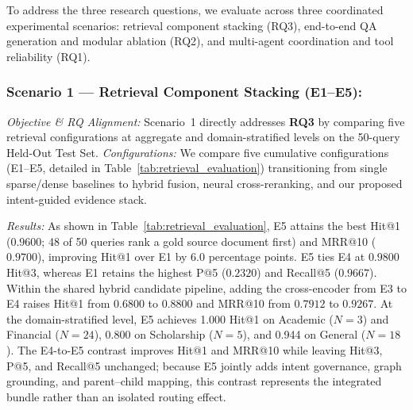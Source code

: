 To address the three research questions, we evaluate \system{} across three coordinated experimental scenarios: retrieval component stacking (RQ3), end-to-end QA generation and modular ablation (RQ2), and multi-agent coordination and tool reliability (RQ1).

\subsubsection{Scenario 1 --- Retrieval Component Stacking (E1--E5):}
\emph{Objective \& RQ Alignment:} Scenario~1 directly addresses \textbf{RQ3} by comparing five retrieval configurations at aggregate and domain-stratified levels on the 50-query Held-Out Test Set.
\emph{Configurations:} We compare five cumulative configurations (E1--E5, detailed in Table~\ref{tab:retrieval_evaluation}) transitioning from single sparse/dense baselines to hybrid fusion, neural cross-reranking, and our proposed intent-guided evidence stack.

\emph{Results:} As shown in Table~\ref{tab:retrieval_evaluation}, E5 attains the best Hit@1 ($0.9600$; 48 of 50 queries rank a gold source document first) and MRR@10 ($0.9700$), improving Hit@1 over E1 by 6.0 percentage points. E5 ties E4 at $0.9800$ Hit@3, whereas E1 retains the highest P@5 ($0.2320$) and Recall@5 ($0.9667$). Within the shared hybrid candidate pipeline, adding the cross-encoder from E3 to E4 raises Hit@1 from $0.6800$ to $0.8800$ and MRR@10 from $0.7912$ to $0.9267$. At the domain-stratified level, E5 achieves 1.000 Hit@1 on Academic ($N=3$) and Financial ($N=24$), 0.800 on Scholarship ($N=5$), and 0.944 on General ($N=18$). The E4-to-E5 contrast improves Hit@1 and MRR@10 while leaving Hit@3, P@5, and Recall@5 unchanged; because E5 jointly adds intent governance, graph grounding, and parent--child mapping, this contrast represents the integrated bundle rather than an isolated routing effect.

\begin{table}[!htbp]
\centering
\caption{Scenario 1: Progressive retrieval component stacking on the Held-Out Test Set ($N=50$).}
\label{tab:retrieval_evaluation}
\end{table}


